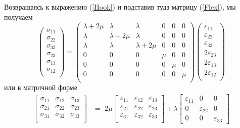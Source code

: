 \documentclass[12pt, a4paper]{article}
\begin{document}
	Возвращаясь к выражению (\ref{Hook}) и подставив туда матрицу (\ref{Flex}), мы получаем
	\[
	\begin{pmatrix}
		\sigma_{11} \\
		\sigma_{22} \\
		\sigma_{33} \\
		\sigma_{23} \\
		\sigma_{13} \\
		\sigma_{12} \\
	\end{pmatrix}
	= 
	\begin{pmatrix}
		\lambda + 2\mu & \lambda & \lambda & 0 & 0 & 0 \\
		\lambda & \lambda + 2\mu & \lambda & 0 & 0 & 0 \\
		\lambda & \lambda & \lambda + 2\mu & 0 & 0 & 0 \\
		0 &      0 &      0 & \mu & 0 & 0 \\
		0 &      0 &      0 & 0 & \mu & 0 \\
		0 &      0 &      0 & 0 & 0 & \mu \\
	\end{pmatrix} 
	\begin{pmatrix}
		\varepsilon_{11} \\
		\varepsilon_{22} \\
		\varepsilon_{33} \\
		2\varepsilon_{23} \\
		2\varepsilon_{13} \\
		2\varepsilon_{12} \\
	\end{pmatrix}
	\]	
	\noindent или в матричной форме
	\[
	\begin{split}
		\begin{bmatrix}
			\sigma_{11} & \sigma_{12} & \sigma_{13} \\
			\sigma_{21} & \sigma_{22} & \sigma_{23} \\
			\sigma_{31} & \sigma_{32} & \sigma_{33} \\
		\end{bmatrix}
		&= \,\,
		2\mu \begin{bmatrix}
			\varepsilon_{11} & \varepsilon_{12} & \varepsilon_{13} \\
			\varepsilon_{21} & \varepsilon_{22} & \varepsilon_{23} \\
			\varepsilon_{31} & \varepsilon_{32} & \varepsilon_{33} \\
		\end{bmatrix}
		+ \lambda \begin{bmatrix}
			\varepsilon_{11} & 0 & 0 \\
			0 & \varepsilon_{22} & 0 \\ 
			0 & 0 & \varepsilon_{33} 
		\end{bmatrix}
	\end{split}
	\]
	
\end{document}
